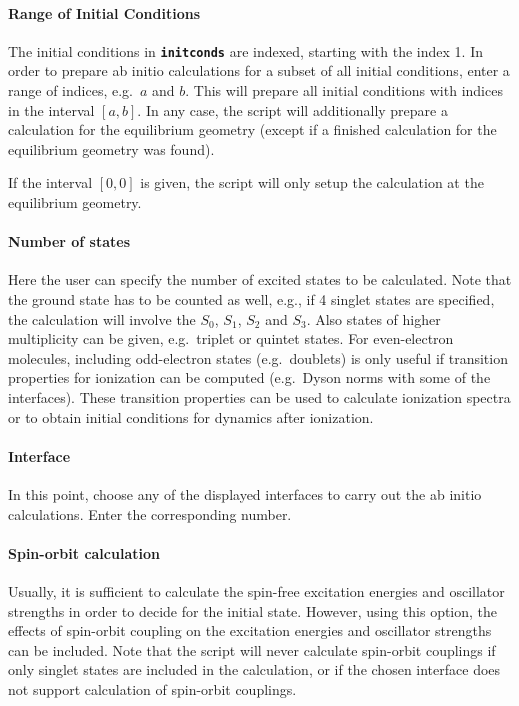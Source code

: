 \documentclass[a4paper,10pt,DIV=15,openany]{scrbook}
\newcommand{\ttt}[1]{\textbf{\texttt{#1}}}
\begin{document}
\paragraph{Range of Initial Conditions}

The initial conditions in \ttt{initconds} are indexed, starting with the index 1. In order to prepare ab initio calculations for a subset of all initial conditions, enter a range of indices, e.g.\ $a$ and $b$. This will prepare all initial conditions with indices in the interval $[a,b]$. In any case, the script will additionally prepare a calculation for the equilibrium geometry (except if a finished calculation for the equilibrium geometry was found).

If the interval $[0,0]$ is given, the script will only setup the calculation at the equilibrium geometry.

\paragraph{Number of states}

Here the user can specify the number of excited states to be calculated. Note that the ground state has to be counted as well, e.g., if 4 singlet states are specified, the calculation will involve the $S_0$, $S_1$, $S_2$ and $S_3$. Also states of higher multiplicity can be given, e.g.\ triplet or quintet states. 
For even-electron molecules, including odd-electron states (e.g.\ doublets) is only useful if transition properties for ionization can be computed (e.g.\ Dyson norms with some of the interfaces). These transition properties can be used to calculate ionization spectra or to obtain initial conditions for dynamics after ionization.

\paragraph{Interface}

In this point, choose any of the displayed interfaces to carry out the ab initio calculations. Enter the corresponding number. 

\paragraph{Spin-orbit calculation}

Usually, it is sufficient to calculate the spin-free excitation energies and oscillator strengths in order to decide for the initial state. However, using this option, the effects of spin-orbit coupling on the excitation energies and oscillator strengths can be included. Note that the script will never calculate spin-orbit couplings if only singlet states are included in the calculation, or if the chosen interface does not support calculation of spin-orbit couplings.
\end{document}
